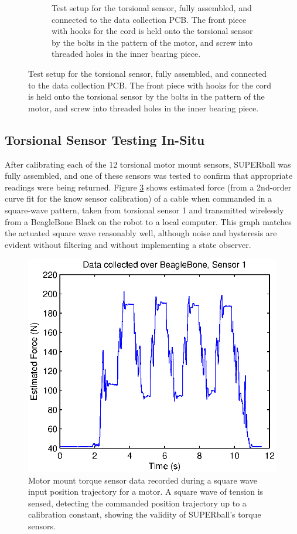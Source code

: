 \documentclass[12pt]{report}
\begin{document}
\begin{figure}[hbt]
\begin{center}
\begin{subfigure}[b]{0.45\textwidth}
      \caption{Test setup for the torsional sensor, fully assembled, and connected to the data collection PCB. The front piece with hooks for the cord is held onto the torsional sensor by the bolts in the pattern of the motor, and screw into threaded holes in the inner bearing piece.}
      \label{fig:sensor_test_setup_complete}
    \end{subfigure}
  \end{center}
\end{figure}

\subsection{Torsional Sensor Testing In-Situ}

After calibrating each of the 12 torsional motor mount sensors, SUPERball was fully assembled, and one of these sensors was tested to confirm that appropriate readings were being returned.
Figure \ref{fig:sensor1data} shows estimated force (from a 2nd-order curve fit for the know sensor calibration) of a cable when commanded in a square-wave pattern, taken from torsional sensor 1 and transmitted wirelessly from a BeagleBone Black on the robot to a local computer.
This graph matches the actuated square wave reasonably well, although noise and hysteresis are evident without filtering and without implementing a state observer.

\begin{figure}
      \centering
      \includegraphics[width=0.6\columnwidth]{img/Force_Time_Graph_adjusted.eps}
      \caption{Motor mount torque sensor data recorded during a square wave input position trajectory for a motor. A square wave of tension is sensed, detecting the commanded position trajectory up to a calibration constant, showing the validity of SUPERball's torque sensors.}
      \label{fig:sensor1data}
      \vspace{-0.4cm}
\end{figure}
\end{document}
